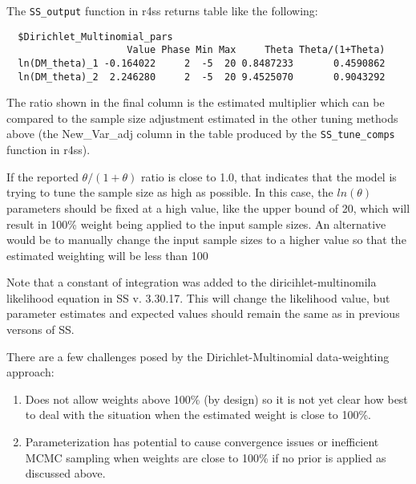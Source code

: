 The \texttt{SS\_output} function in r4ss returns table like the following:
\begin{small}
\begin{verbatim}
  $Dirichlet_Multinomial_pars
                     Value Phase Min Max     Theta Theta/(1+Theta)
  ln(DM_theta)_1 -0.164022     2  -5  20 0.8487233       0.4590862
  ln(DM_theta)_2  2.246280     2  -5  20 9.4525070       0.9043292
\end{verbatim}
\end{small}


The ratio shown in the final column is the estimated multiplier which can be compared to the sample size adjustment estimated in the other tuning methods above (the New\_Var\_adj column in the table produced by the \texttt{SS\_tune\_comps} function in r4ss).

If the reported $\theta/(1+\theta)$ ratio is close to 1.0, that indicates that the model is trying to tune the sample size as high as possible. In this case, the $ln(\theta)$ parameters should be fixed at a high value, like the upper bound of 20, which will result in 100\% weight being applied to the input sample sizes. An alternative would be to manually change the input sample sizes to a higher value so that the estimated weighting will be less than 100%

Note that a constant of integration was added to the diricihlet-multinomila likelihood equation in SS v. 3.30.17. This will change the likelihood value, but parameter estimates and expected values should remain the same as in previous versons of SS.



There are a few challenges posed by the Dirichlet-Multinomial data-weighting approach:
\begin{enumerate}
	\item Does not allow weights above 100\% (by design) so it is not yet clear how best to deal with the situation when the estimated weight is close to 100\%.
	
	\item Parameterization has potential to cause convergence issues or inefficient MCMC sampling when weights are close to 100\% if no prior is applied as discussed above.
\end{enumerate}